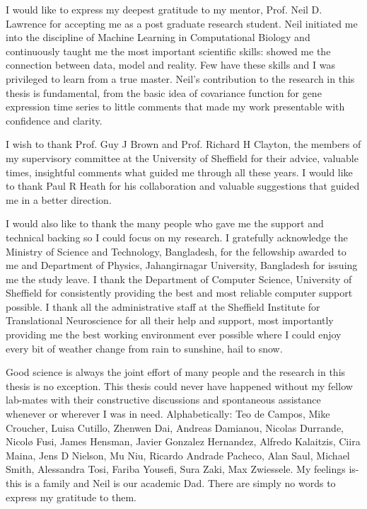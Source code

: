 
\begin{acknowledgements}      


I would like to express my deepest gratitude to my mentor, Prof. Neil D. Lawrence for accepting me as a post graduate research student. Neil initiated me into the discipline of Machine Learning in Computational Biology and continuously taught me the most important scientific skills: showed me the connection between data, model and reality. Few have these skills and I was privileged to learn from a true master. Neil’s contribution to the research in this thesis is fundamental, from the basic idea of covariance function for gene expression time series to little comments that made my work presentable with confidence and clarity.

I wish to thank Prof. Guy J Brown and Prof. Richard H Clayton, the members of my supervisory committee at the University of Sheffield for their advice, valuable times, insightful comments what guided me through all these years. I would like to thank Paul R Heath for his collaboration and valuable suggestions that guided me in a better direction.

I would also like to thank the many people who gave me the support and technical backing so I could focus on my research. I gratefully acknowledge the Ministry of Science and Technology, Bangladesh, for the fellowship awarded to me and Department of Physics, Jahangirnagar University, Bangladesh for issuing me the study leave. I thank the Department of Computer Science, University of Sheffield for consistently providing the best and most reliable computer support possible. I thank all the administrative staff at the Sheffield Institute for Translational Neuroscience for all their help and support, most importantly providing me the best working environment ever possible where I could enjoy every bit of weather change from rain to sunshine, hail to snow.

Good science is always the joint effort of many people and the research in this thesis is no exception. This thesis could never have happened without my fellow lab-mates with their constructive discussions and spontaneous assistance whenever or wherever I was in need. Alphabetically: Teo de Campos, Mike Croucher, Luisa Cutillo, Zhenwen Dai, Andreas Damianou, Nicolas Durrande, Nicol{\o} Fusi, James Hensman, Javier Gonzalez Hernandez, Alfredo Kalaitzis, Ciira Maina, Jens D Nielson, Mu Niu, Ricardo Andrade Pacheco, Alan Saul, Michael Smith, Alessandra Tosi, Fariba Yousefi, Sura Zaki, Max Zwiessele. My feelings is- this is a family and Neil is our academic Dad. There are simply no words to express my gratitude to them.


\end{acknowledgements}
